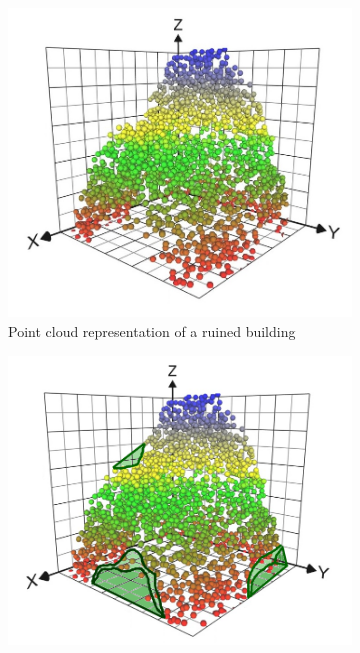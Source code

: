 \documentclass[12pt,a4paper]{article}
\begin{document}
        \begin{figure}
        \centering
        \begin{subfigure}[b]{0.3\textwidth}
            \centering
            \includegraphics[width=\textwidth]{scatter1.jpg}
            \caption[]{{\small Point cloud representation of a ruined building}}    
            \label{fig:scatter}
        \end{subfigure}
        \quad
        \begin{subfigure}[b]{0.3\textwidth}  
            \centering 
            \includegraphics[width=\textwidth]{missing2.png}

\end{subfigure}
\end{figure}
\end{document}
